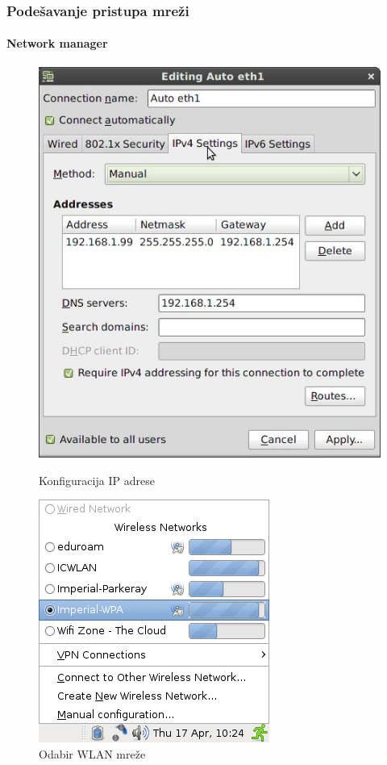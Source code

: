 \documentclass[table,usenames,dvipsnames]{beamer}
\begin{document}
\begin{frame}[t]
	\frametitle{Podešavanje pristupa mreži}
	\framesubtitle{Network manager}

	\begin{figure}[h]
		\begin{minipage}{0.4\textwidth}
			\centering
			\includegraphics[width=\linewidth]{nm-ethernet.jpg}
			\caption{Konfiguracija IP adrese}
		\end{minipage}
		\begin{minipage}{0.45\textwidth}
			\centering
			\includegraphics[width=0.8\linewidth]{nm-applet.png}
			\caption{Odabir WLAN mreže}
		\end{minipage}
	\end{figure}
\end{frame}	
\end{document}
